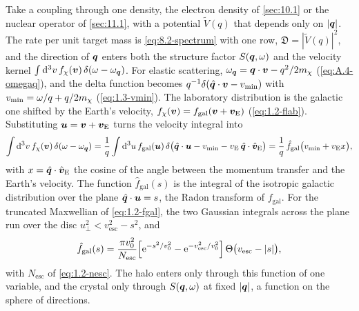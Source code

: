 Take a coupling through one density, the electron density of \cref{sec:10.1} or the nuclear operator of \cref{sec:11.1}, with a potential $\tilde V(q)$ that depends only on $|\bm{q}|$. The rate per unit target mass is \cref{eq:8.2-spectrum} with one row, $\mathfrak{D} = |\tilde V(q)|^2$, and the direction of $\bm{q}$ enters both the structure factor $S(\bm{q},\omega)$ and the velocity kernel $\int\mathrm{d}^3v\,f_\chi(\bm{v})\,\delta(\omega - \omega_{\bm{q}})$. For elastic scattering, $\omega_{\bm{q}} = \bm{q}\cdot\bm{v} - q^2/2m_{\chi}$ (\cref{eq:A.4-omegaq}), and the delta function becomes $q^{-1}\delta(\hat{\bm{q}}\cdot\bm{v} - v_{\mathrm{min}})$ with $v_{\mathrm{min}} = \omega/q + q/2m_{\chi}$ (\cref{eq:1.3-vmin}). The laboratory distribution is the galactic one shifted by the Earth's velocity, $f_\chi(\bm{v}) = f_{\mathrm{gal}}(\bm{v} + \bm{v}_{\mathrm{E}})$ (\cref{eq:1.2-flab}). Substituting $\bm{u} = \bm{v} + \bm{v}_{\mathrm{E}}$ turns the velocity integral into
\begin{equation*}
  \int\mathrm{d}^3v\,f_\chi(\bm{v})\,\delta(\omega - \omega_{\bm{q}}) = \frac1q\int\mathrm{d}^3u\,f_{\mathrm{gal}}(\bm{u})\,\delta\bigl(\hat{\bm{q}}\cdot\bm{u} - v_{\mathrm{min}} - v_{\mathrm{E}}\,\hat{\bm{q}}\cdot\hat{\bm{v}}_{\mathrm{E}}\bigr) = \frac1q\,\hat f_{\mathrm{gal}}\bigl(v_{\mathrm{min}} + v_{\mathrm{E}}x\bigr) ,
\end{equation*}
with $x = \hat{\bm{q}}\cdot\hat{\bm{v}}_{\mathrm{E}}$ the cosine of the angle between the momentum transfer and the Earth's velocity. The function $\hat f_{\mathrm{gal}}(s)$ is the integral of the isotropic galactic distribution over the plane $\hat{\bm{q}}\cdot\bm{u} = s$, the Radon transform of $f_{\mathrm{gal}}$. For the truncated Maxwellian of \cref{eq:1.2-fgal}, the two Gaussian integrals across the plane run over the disc $u_\perp^2 < v_{\mathrm{esc}}^2 - s^2$, and
\begin{equation*}
  \hat f_{\mathrm{gal}}(s) = \frac{\pi v_0^2}{N_{\mathrm{esc}}}\Bigl[\mathrm{e}^{-s^2/v_0^2} - \mathrm{e}^{-v_{\mathrm{esc}}^2/v_0^2}\Bigr]\,\Theta\bigl(v_{\mathrm{esc}} - |s|\bigr) ,
\end{equation*}
with $N_{\mathrm{esc}}$ of \cref{eq:1.2-nesc}. The halo enters only through this function of one variable, and the crystal only through $S(\bm{q},\omega)$ at fixed $|\bm{q}|$, a function on the sphere of directions.

